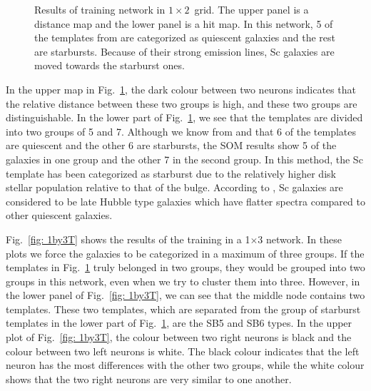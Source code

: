 \begin{figure}
\begin{subfigure}[b]{0.45\textwidth}
                \end{subfigure}
                \caption[Results of training network in $1\times2$~grid]{Results of training network in $1\times2$~grid. The upper panel is a distance map and the lower panel is a hit map. In this network, 5 of the templates from \citet{Kinney96} are categorized as quiescent galaxies and the rest are starbursts. Because of their strong emission lines, Sc galaxies are moved towards the starburst ones.}
                 \label{fig: 1by2T}
            \end{figure}
        
        
            In the upper map in Fig.~\ref{fig: 1by2T}, the dark colour between two neurons indicates that the relative distance between these two groups is high, and these two groups are distinguishable.
            In the lower part of Fig.~\ref{fig: 1by2T}, we see that the templates are divided into two groups of 5 and 7.
            Although we know from  and  that 6 of the templates are quiescent and the other 6 are starbursts, the SOM results show 5 of the galaxies in one group and the other 7 in the second group.
            In this method, the Sc template has been categorized as starburst due to the relatively higher disk stellar population relative to that of the bulge. 
            According to , Sc galaxies are considered to be late Hubble type galaxies which have  flatter spectra compared to other quiescent galaxies. 
            

            Fig.~\ref{fig: 1by3T} shows the results of the training in a 1$\times$3 network.
            In these plots we force the galaxies to be categorized in a maximum of three groups. 
            If the templates in Fig.~\ref{fig: 1by2T} truly belonged in two groups, they would be grouped into two groups in this network, even when we try to cluster them into three. 
            However, in the lower panel of Fig.~\ref{fig: 1by3T}, we can see that the middle node contains two templates.
            These two templates, which are separated from the group of starburst templates in the lower part of Fig.~\ref{fig: 1by2T},  are the SB5 and SB6 types.
            In the upper plot of Fig.~\ref{fig: 1by3T}, the colour between two right neurons is black and the colour between two left neurons is white. 
            The black colour indicates that the left neuron has the most differences with the other two groups,
            while the white colour shows that the two right neurons are very similar to one another. 
            

